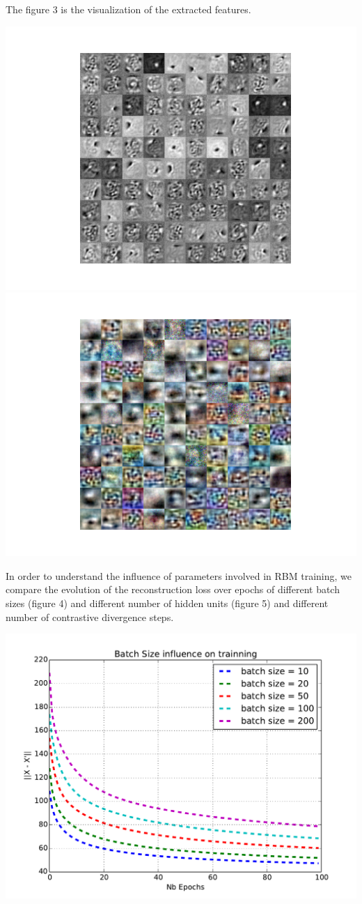 \documentclass[landscape,a1paper,fontscale=0.5]{baposter} %
\begin{document}
\begin{poster}
{\begin{multicols}{2}
The figure 3 is the visualization of the extracted features.

\begin{center}
\includegraphics[width=0.4\linewidth]{MNIST_Filter_20Epochs}
\includegraphics[width=0.4\linewidth]{CIFAR_LearnedWeights}
\end{center}

In order to understand the influence of parameters involved in RBM training, we compare the evolution of the reconstruction loss over epochs of different batch sizes (figure 4) and different number of hidden units (figure 5) and different number of contrastive divergence steps.


\begin{center}
	\centering
	\includegraphics[width=\linewidth,height=0.65\linewidth]{batchsize}
\end{center}


\end{multicols}}
\end{poster}
\end{document}
